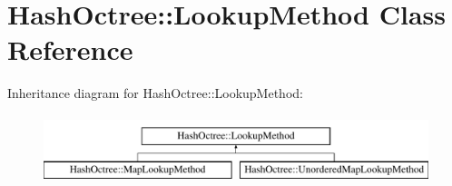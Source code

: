\hypertarget{class_hash_octree_1_1_lookup_method}{}\section{Hash\+Octree\+::Lookup\+Method Class Reference}
\label{class_hash_octree_1_1_lookup_method}
Inheritance diagram for Hash\+Octree\+::Lookup\+Method\+:\begin{figure}[H]
\begin{center}
\leavevmode
\includegraphics[height=2.000000cm]{class_hash_octree_1_1_lookup_method}
\end{center}
\end{figure}
